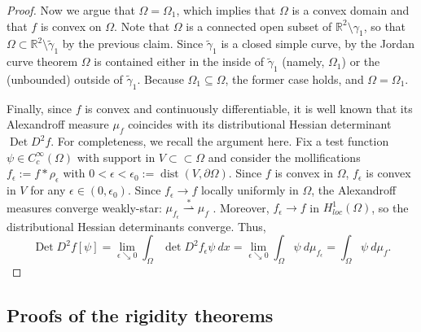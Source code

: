 \documentclass[12pt]{article}
\newcommand{\dist}{\operatorname{dist}}
\newcommand{\Det}{\operatorname{Det}}
\theoremstyle{plain}
\numberwithin{equation}{section}
\begin{document}
\begin{proof}
    Now we argue that $\Omega = \Omega_1$, which implies that $\Omega$ is a convex domain and that $f$ is convex on $\Omega$. Note that $\Omega$ is a connected open subset of $\mathbb{R}^2 \setminus \gamma_1$, so that $\Omega \subset \mathbb{R}^2 \setminus \tilde\gamma_1$ by the previous claim. Since $\tilde\gamma_1$ is a closed simple curve, by the Jordan curve theorem $\Omega$ is contained either in the inside of $\tilde\gamma_1$ (namely, $\Omega_1$) or the (unbounded) outside of $\tilde\gamma_1$. Because $\Omega_1 \subseteq \Omega$, the former case holds, and $\Omega = \Omega_1$.
    
    Finally, since $f$ is convex and continuously differentiable, it is well known that its Alexandroff measure $\mu_f$ coincides with its distributional Hessian determinant $\Det D^2 f$. For completeness, we recall the argument here. Fix a test function $\psi \in C^\infty_c(\Omega)$ with support in $V \subset \subset \Omega$ and consider the mollifications $f_\epsilon := f*\rho_\epsilon$ with $0 < \epsilon < \epsilon_0:= \dist(V,\partial \Omega)$. Since $f$ is convex in $\Omega$, $f_\epsilon$ is convex in $V$ for any $\epsilon \in (0,\epsilon_0)$. Since $f_\epsilon \to f$ locally uniformly in $\Omega$, the Alexandroff measures converge weakly-star: $\mu_{f_\epsilon} \overset \ast \rightharpoonup \mu_f$ \cite[Proposition 3.2]{figalli_19}. Moreover, $f_\epsilon \to f$ in $H^1_{loc}(\Omega)$, so the distributional Hessian determinants converge. Thus,
    \begin{equation*}
        \Det D^2 f[\psi] = \lim_{\epsilon \searrow 0} \int_\Omega \det D^2 f_\epsilon \psi~dx = \lim_{\epsilon \searrow 0} \int_\Omega \psi~d\mu_{f_\epsilon} = \int_\Omega \psi ~d\mu_f.
    \end{equation*}
\end{proof}

\subsection{Proofs of the rigidity theorems} \label{sec:proofs_convexity_theorems}
\end{document}
